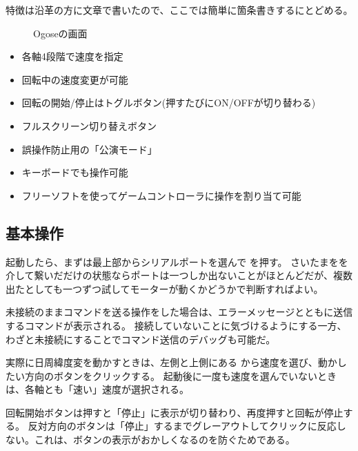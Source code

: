 \documentclass[letterpaper,10pt,dvipdfmx]{sphinxmanual}
\begin{document}
特徴は沿革の方に文章で書いたので、ここでは簡単に箇条書きするにとどめる。
\begin{figure}[htbp]
\centering
\capstart

\noindent{}
\caption{Ogoseの画面}\label{\detokenize{nissyu-idohen/pc-software:id12}}\end{figure}
\begin{itemize}
\item {} 
各軸4段階で速度を指定

\item {} 
回転中の速度変更が可能

\item {} 
回転の開始/停止はトグルボタン(押すたびにON/OFFが切り替わる)

\item {} 
フルスクリーン切り替えボタン

\item {} 
誤操作防止用の「公演モード」

\item {} 
キーボードでも操作可能

\item {} 
フリーソフトを使ってゲームコントローラに操作を割り当て可能

\end{itemize}


\subsection{基本操作}
\label{\detokenize{nissyu-idohen/pc-software:id4}}
起動したら、まずは最上部からシリアルポートを選んで
を押す。
さいたまをを介して繋いだだけの状態ならポートは一つしか出ないことがほとんどだが、複数出たとしても一つずつ試してモーターが動くかどうかで判断すればよい。

未接続のままコマンドを送る操作をした場合は、エラーメッセージとともに送信するコマンドが表示される。
接続していないことに気づけるようにする一方、わざと未接続にすることでコマンド送信のデバッグも可能だ。

実際に日周緯度変を動かすときは、左側と上側にある
から速度を選び、動かしたい方向のボタンをクリックする。
起動後に一度も速度を選んでいないときは、各軸とも「速い」速度が選択される。

回転開始ボタンは押すと「停止」に表示が切り替わり、再度押すと回転が停止する。
反対方向のボタンは「停止」するまでグレーアウトしてクリックに反応しない。これは、ボタンの表示がおかしくなるのを防ぐためである。
\end{document}
